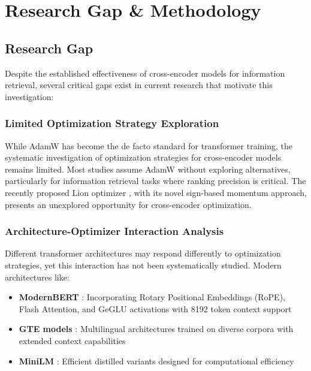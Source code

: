 
\chapter{Research Gap \& Methodology} %

\label{Chapter3} %

\section{Research Gap}

Despite the established effectiveness of cross-encoder models for information retrieval, several critical gaps exist in current research that motivate this investigation:

\subsection{Limited Optimization Strategy Exploration}

While AdamW has become the de facto standard for transformer training, the systematic investigation of optimization strategies for cross-encoder models remains limited. Most studies assume AdamW without exploring alternatives, particularly for information retrieval tasks where ranking precision is critical. The recently proposed Lion optimizer \cite{chen2023symbolic}, with its novel sign-based momentum approach, presents an unexplored opportunity for cross-encoder optimization.

\subsection{Architecture-Optimizer Interaction Analysis}

Different transformer architectures may respond differently to optimization strategies, yet this interaction has not been systematically studied. Modern architectures like:

\begin{itemize}
    \item \textbf{ModernBERT} \cite{modernbert}: Incorporating Rotary Positional Embeddings (RoPE), Flash Attention, and GeGLU activations with 8192 token context support
    \item \textbf{GTE models} \cite{li2023towards}: Multilingual architectures trained on diverse corpora with extended context capabilities
    \item \textbf{MiniLM} \cite{wang2020minilm}: Efficient distilled variants designed for computational efficiency
\end{itemize}

